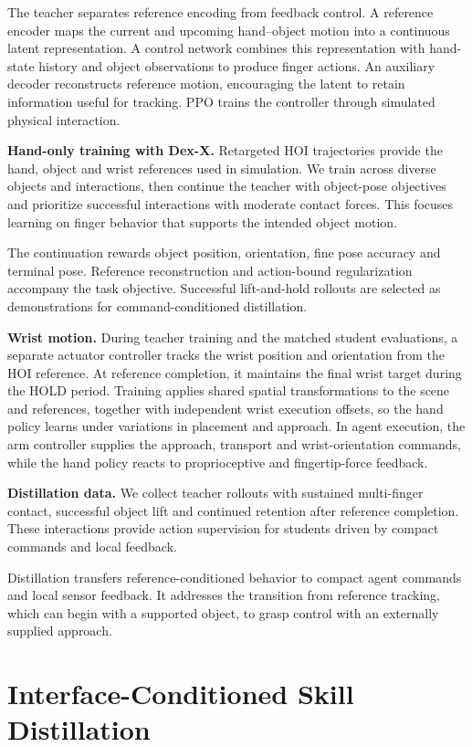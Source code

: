 \documentclass[10pt,twocolumn]{article}
\begin{document}
The teacher separates reference encoding from feedback control. A reference encoder maps the current and upcoming hand--object motion into a continuous latent representation. A control network combines this representation with hand-state history and object observations to produce finger actions. An auxiliary decoder reconstructs reference motion, encouraging the latent to retain information useful for tracking. PPO \citep{schulman2017} trains the controller through simulated physical interaction.

\textbf{Hand-only training with Dex-X.} Retargeted HOI trajectories provide the hand, object and wrist references used in simulation. We train across diverse objects and interactions, then continue the teacher with object-pose objectives and prioritize successful interactions with moderate contact forces. This focuses learning on finger behavior that supports the intended object motion.

The continuation rewards object position, orientation, fine pose accuracy and terminal pose. Reference reconstruction and action-bound regularization accompany the task objective. Successful lift-and-hold rollouts are selected as demonstrations for command-conditioned distillation.

\textbf{Wrist motion.} During teacher training and the matched student evaluations, a separate actuator controller tracks the wrist position and orientation from the HOI reference. At reference completion, it maintains the final wrist target during the HOLD period. Training applies shared spatial transformations to the scene and references, together with independent wrist execution offsets, so the hand policy learns under variations in placement and approach. In agent execution, the arm controller supplies the approach, transport and wrist-orientation commands, while the hand policy reacts to proprioceptive and fingertip-force feedback.

\textbf{Distillation data.} We collect teacher rollouts with sustained multi-finger contact, successful object lift and continued retention after reference completion. These interactions provide action supervision for students driven by compact commands and local feedback.

Distillation transfers reference-conditioned behavior to compact agent commands and local sensor feedback. It addresses the transition from reference tracking, which can begin with a supported object, to grasp control with an externally supplied approach.

\section{Interface-Conditioned Skill Distillation}
\end{document}
